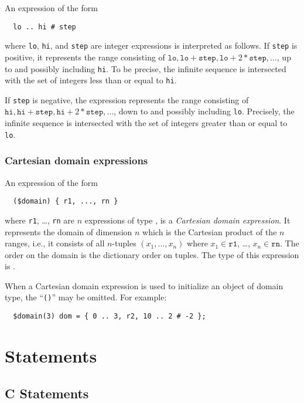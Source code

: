 An expression of the form
\begin{verbatim}
  lo .. hi # step
\end{verbatim}
where \texttt{lo}, \texttt{hi}, and \texttt{step} are integer
expressions is interpreted as follows.  If \texttt{step} is positive,
it represents the range consisting of $\texttt{lo},
\texttt{lo}+\texttt{step}, \texttt{lo}+2*\texttt{step}, \ldots$, up to
and possibly including \texttt{hi}.  To be precise, the infinite
sequence is intersected with the set of integers less than or equal to
\texttt{hi}.

If \texttt{step} is negative, the expression represents the range
consisting of $\texttt{hi}, \texttt{hi}+\texttt{step},
\texttt{hi}+2*\texttt{step}, \ldots$, down to and possibly including
\texttt{lo}.  Precisely, the infinite sequence is intersected with the
set of integers greater than or equal to \texttt{lo}.

\subsubsection{Cartesian domain expressions}
\label{sec:domain_expr}

An expression of the form
\begin{verbatim}
  ($domain) { r1, ..., rn }
\end{verbatim}
where \texttt{r1}, \ldots, \texttt{rn} are $n$ expressions of type
\crange, is a \emph{Cartesian domain expression}.  It represents the
domain of dimension $n$ which is the Cartesian product of the $n$
ranges, i.e., it consists of all $n$-tuples $(x_1,\ldots,x_n)$ where
$x_1\in\texttt{r1}$, \ldots, $x_n\in\texttt{rn}$.  The order on the
domain is the dictionary order on tuples.  The type of this expression
is .

When a Cartesian domain expression is used to initialize an object of
domain type, the ``\texttt{(}\cdomain\texttt{)}'' may be omitted.
For example:
\begin{verbatim}
  $domain(3) dom = { 0 .. 3, r2, 10 .. 2 # -2 };
\end{verbatim}


\section{Statements}

\subsection{C Statements}

